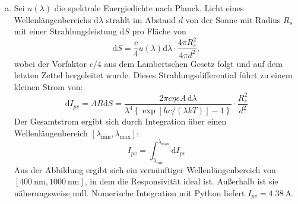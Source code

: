 \begin{enumerate}[(a)]
\item Sei $u(\lambda)$ die spektrale Energiedichte nach Planck. Licht eines Wellenlängenbereichs $\mathrm{d}\lambda$ strahlt im Abstand $d$ von der Sonne mit Radius $R_s$ mit einer Strahlungsleistung $\mathrm{d}S$ pro Fläche von
\begin{equation}
\mathrm{d}S = \frac{c}{4} u(\lambda) \mathrm{d}\lambda \cdot \frac{4\pi R_s^2}{4\pi d^2},
\end{equation}
wobei der Vorfaktor $c/4$ aus dem Lambertschen Gesetz folgt und auf dem letzten Zettel hergeleitet wurde. Dieses Strahlungsdifferential führt zu einem kleinen Strom von:
\begin{equation}
\mathrm{d} I_{pv} = A R \mathrm{d}S = \frac{2\pi c \eta e A \,\mathrm{d}\lambda}{\lambda^4\left\{\exp\left[hc/(\lambda k T)\right]-1 \right\}} \cdot \frac{R_s^2}{d^2}
\end{equation}
Der Gesamtstrom ergibt sich durch Integration über einen Wellenlängenbereich $\left[\lambda_\text{min}, \lambda_\text{max} \right]$:
\begin{equation}
I_{pv} = \int_{\lambda_\text{min}}^{\lambda_\text{max}}\mathrm{d} I_{pv}
\end{equation}
Aus der Abbildung ergibt sich ein vernünftiger Wellenlängenbereich von $\left[\SI{400}{\nano\meter}, \SI{1000}{\nano\meter} \right]$, in dem die Responsivität ideal ist. Außerhalb ist sie näherungsweise null. Numerische Integration mit Python liefert $I_{pv}=\SI{4.38}{\ampere}$.  
\end{enumerate}